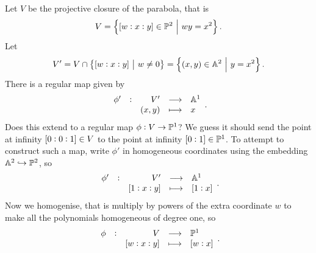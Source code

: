 \begin{example*}
Let $ V $ be the projective closure of the parabola, that is
$$ V = \cbr{\sbr{w : x : y} \in \PP^2 \st wy = x^2}. $$
Let
$$ V' = V \cap \cbr{\sbr{w : x : y} \st w \ne 0} = \cbr{\br{x, y} \in \AA^2 \st y = x^2}. $$
There is a regular map given by
$$ \function[\phi']{V'}{\AA^1}{\br{x, y}}{x}. $$
Does this extend to a regular map $ \phi : V \to \mathbb{P}^1 $? We guess it should send the point at infinity $ \sbr{0 : 0 : 1} \in V $ to the point at infinity $ \sbr{0 : 1} \in \PP^1 $. To attempt to construct such a map, write $ \phi' $ in homogeneous coordinates using the embedding $ \mathbb{A}^2 \hookrightarrow \mathbb{P}^2 $, so
$$ \function[\phi']{V'}{\AA^1}{\sbr{1 : x : y}}{\sbr{1 : x}}. $$
Now we homogenise, that is multiply by powers of the extra coordinate $ w $ to make all the polynomials homogeneous of degree one, so
$$ \function[\phi]{V}{\PP^1}{\sbr{w : x : y}}{\sbr{w : x}}. $$

\pagebreak


\end{example*}
